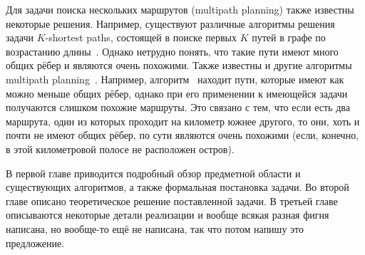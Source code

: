 Для задачи поиска нескольких маршрутов (multipath planning) также
известны некоторые решения. Например, существуют различные алгоритмы
решения задачи $K$-shortest paths, состоящей в поиске первых $K$ путей
в графе по возрастанию длины~\cite{eppstein1998finding,
yen1971finding}. Однако нетрудно понять, что такие пути имеют много
общих рёбер и являются очень похожими. Также известны и другие
алгоритмы multipath planning~\cite{lim2005shortest,
dial1971probabilistic, mafast}. Например,
алгоритм~\cite{lim2005shortest} находит пути, которые имеют как можно
меньше общих рёбер, однако при его применении к имеющейся задачи
получаются слишком похожие маршруты. Это связано с тем, что если есть
два маршрута, один из которых проходит на километр южнее другого, то
они, хоть и почти не имеют общих рёбер, по сути являются очень
похожими (если, конечно, в этой километровой полосе не расположен
остров).


В первой главе приводится подробный обзор предметной области и
существующих алгоритмов, а также формальная постановка задачи. Во
второй главе описано теоретическое решение поставленной задачи. В третьей
главе описываются некоторые детали реализации и вообще всякая разная
фигня написана, но вообще-то ещё не написана, так что потом напишу это
предложение.

\FloatBarrier

